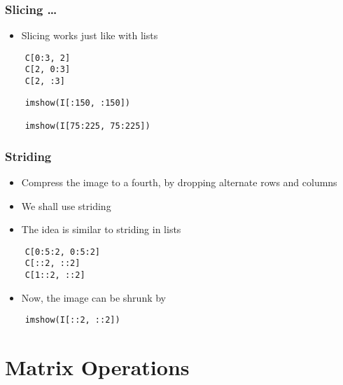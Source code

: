 \begin{frame}[fragile]
  \frametitle{Slicing \ldots}
  \begin{itemize}
  \item Slicing works just like with lists
  \end{itemize}
  \begin{lstlisting}
    C[0:3, 2]
    C[2, 0:3]
    C[2, :3]
  \end{lstlisting}
  \begin{lstlisting}
    imshow(I[:150, :150])

    imshow(I[75:225, 75:225])
  \end{lstlisting}
\end{frame}

\begin{frame}[fragile]
  \frametitle{Striding}
  \begin{itemize}
  \item Compress the image to a fourth, by dropping alternate rows and
    columns
  \item We shall use striding
  \item The idea is similar to striding in lists
  \end{itemize}
  \begin{lstlisting}
    C[0:5:2, 0:5:2]
    C[::2, ::2]
    C[1::2, ::2]
  \end{lstlisting}
  \begin{itemize}
  \item Now, the image can be shrunk by
  \end{itemize}
  \begin{lstlisting}
    imshow(I[::2, ::2])
  \end{lstlisting}
\end{frame}

\section{Matrix Operations}

